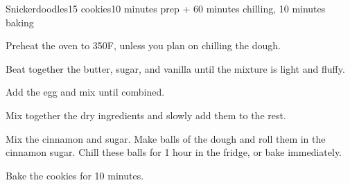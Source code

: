 \documentclass[../Cookbook.tex]{subfiles}
\begin{document}
\begin{recipe}{Snickerdoodles}{15 cookies}{10 minutes prep + 60 minutes chilling, 10 minutes baking}

Preheat the oven to 350\0F, unless you plan on chilling the dough.

Beat together the butter, sugar, and vanilla until the mixture is light and fluffy.

Add the egg and mix until combined.

Mix together the dry ingredients and slowly add them to the rest.

Mix the cinnamon and sugar. Make balls of the dough and roll them in the cinnamon sugar. Chill these balls for 1 hour in the fridge, or bake immediately.

\newstep
Bake the cookies for 10 minutes.

\end{recipe}
\end{document}
